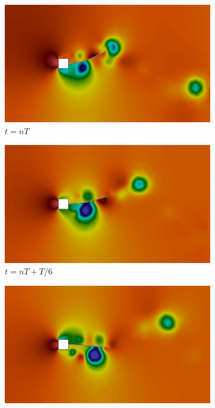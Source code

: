 \begin{figure}[h!]
    \centering
    \caption{\textit{Flutter} em painel - Campo de pressão obtidos no problema de \textit{Flutter} em painel.}
    \begin{subfigure}[b]{0.32\textwidth}
        \includegraphics[width=\linewidth]{Figuras/FSI-prism2/pT1.png}
        \caption{$t=nT$}
    \end{subfigure}
    \begin{subfigure}[b]{0.32\textwidth}
        \includegraphics[width=\linewidth]{Figuras/FSI-prism2/pT2.png}
        \caption{$t=nT+T/6$}
    \end{subfigure}
    \begin{subfigure}[b]{0.32\textwidth}
        \includegraphics[width=\linewidth]{Figuras/FSI-prism2/pT3.png}

\end{subfigure}
\end{figure}
